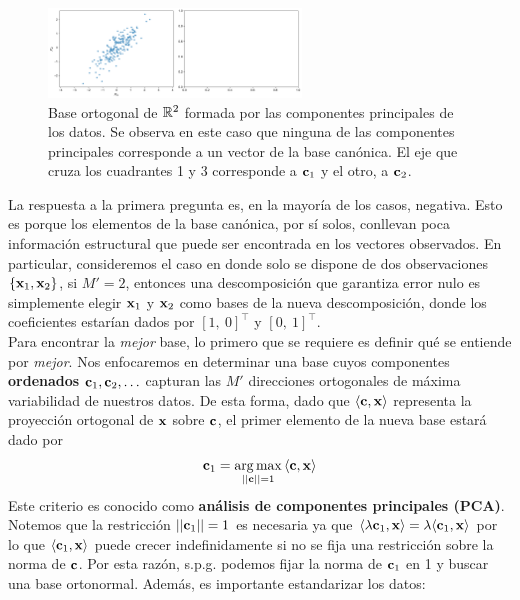 \begin{figure}[H]
	\centering
	\includegraphics[width=0.6\textwidth]{img/cap6_pca.pdf}
	\caption{Base ortogonal de $\mathbb{R}^2$ formada por las componentes principales de los datos. Se observa en este caso que ninguna de las componentes principales corresponde a un vector de la base canónica. El eje que cruza los cuadrantes 1 y 3 corresponde a $\mathbf{c}_1$ y el otro, a $\mathbf{c}_2$.}
	\label{fig:ej_fda}
\end{figure}

La respuesta a la primera pregunta es, en la mayoría de los casos, negativa. Esto es porque los elementos de la base canónica, por sí solos, conllevan poca información estructural que puede ser encontrada en los vectores observados. En particular, consideremos el caso en donde solo se dispone de dos observaciones $\{\mathbf{x}_1, \mathbf{x}_2\}$, si $M'=2$, entonces una descomposición que garantiza error nulo es simplemente elegir $\mathbf{x}_1$ y $\mathbf{x}_2$ como bases de la nueva descomposición, donde los coeficientes estarían dados por $[1,\ 0]^\top$ y $[0,\ 1]^\top$.\\

Para encontrar la \emph{mejor} base, lo primero que se requiere es definir qué se entiende por \emph{mejor}. Nos enfocaremos en determinar una base cuyos componentes \textbf{ordenados} $\mathbf{c}_1,\mathbf{c}_2,\ldots$ capturan las $M'$ direcciones ortogonales de máxima variabilidad de nuestros datos. De esta forma, dado que $\langle\mathbf{c},\mathbf{x}\rangle$ representa la proyección ortogonal de $\mathbf{x}$ sobre $\mathbf{c}$, el primer elemento de la nueva base estará dado por 
\begin{equation}
	\mathbf{c}_1 = \operatorname*{arg\,max}_{||\mathbf{c}||=1} {\langle\mathbf{c},\mathbf{x}\rangle} \label{eq:PCA_max}
\end{equation}
Este criterio es conocido como \textbf{análisis de componentes principales (PCA)}. Notemos que la restricción $||\mathbf{c}_1||=1$ es necesaria ya que $\langle\lambda\mathbf{c}_1,\mathbf{x}\rangle = \lambda\langle\mathbf{c}_1,\mathbf{x}\rangle$ por lo que $\langle\mathbf{c}_1,\mathbf{x}\rangle$ puede crecer indefinidamente si no se fija una restricción sobre la norma de $\mathbf{c}$. Por esta razón, s.p.g. podemos fijar la norma de $\mathbf{c}_1$ en 1 y buscar una base ortonormal. Además, es importante estandarizar los datos:

